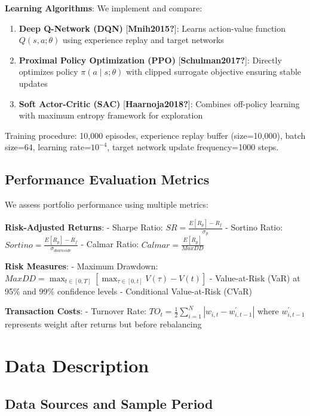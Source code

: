\documentclass[
  10pt,
  a4paper,
]{article}
\begin{document}
\textbf{Learning Algorithms}: We implement and compare:

\begin{enumerate}
\def\labelenumi{\arabic{enumi}.}
\item
  \textbf{Deep Q-Network (DQN)} {[}\textbf{Mnih2015?}{]}: Learns
  action-value function \(Q(s,a;\theta)\) using experience replay and
  target networks
\item
  \textbf{Proximal Policy Optimization (PPO)}
  {[}\textbf{Schulman2017?}{]}: Directly optimizes policy
  \(\pi(a \mid s; \theta)\) with clipped surrogate objective ensuring
  stable updates
\item
  \textbf{Soft Actor-Critic (SAC)} {[}\textbf{Haarnoja2018?}{]}:
  Combines off-policy learning with maximum entropy framework for
  exploration
\end{enumerate}

Training procedure: 10,000 episodes, experience replay buffer
(size=10,000), batch size=64, learning rate=\(10^{-4}\), target network
update frequency=1000 steps.

\subsection{Performance Evaluation Metrics}\label{sec-metrics}

We assess portfolio performance using multiple metrics:

\textbf{Risk-Adjusted Returns}: - Sharpe Ratio:
\(SR = \frac{E[R_p] - R_f}{\sigma_p}\) - Sortino Ratio:
\(Sortino = \frac{E[R_p] - R_f}{\sigma_{downside}}\) - Calmar Ratio:
\(Calmar = \frac{E[R_p]}{MaxDD}\)

\textbf{Risk Measures}: - Maximum Drawdown:
\(MaxDD = \max_{t \in [0,T]} \left[\max_{\tau \in [0,t]} V(\tau) - V(t)\right]\)
- Value-at-Risk (VaR) at 95\% and 99\% confidence levels - Conditional
Value-at-Risk (CVaR)

\textbf{Transaction Costs}: - Turnover Rate:
\(TO_t = \frac{1}{2}\sum_{i=1}^{N} |w_{i,t} - w_{i,t-1}^{'}|\) where
\(w_{i,t-1}^{'}\) represents weight after returns but before rebalancing

\section{Data Description}\label{sec-data}

\subsection{Data Sources and Sample Period}\label{sec-data-sources}
\end{document}
